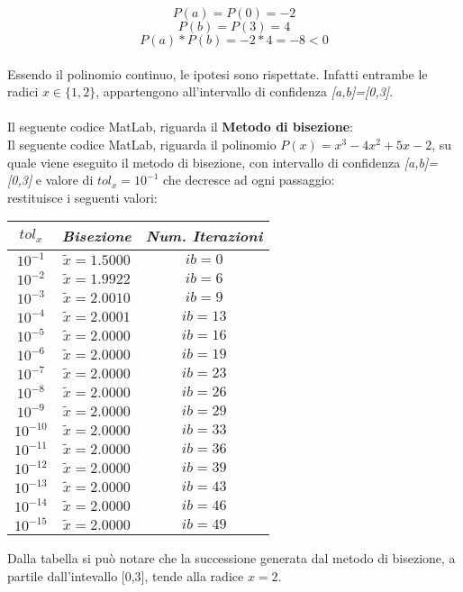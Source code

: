 	\[
	P(a) = P(0) = -2
	\]
	\[
	P(b) = P(3) = 4
	\]
	\[
	P(a)*P(b) = -2 * 4 = -8 < 0
	\]\\
Essendo il polinomio continuo, le ipotesi sono rispettate. Infatti entrambe le radici $x \in \{1,2\}$, appartengono all'intervallo di confidenza \textit{[a,b]=[0,3]}.\\\\
Il seguente codice MatLab, riguarda il \textbf{Metodo di bisezione}:\\
	
Il seguente codice MatLab, riguarda il polinomio $P(x) = x^3-4x^2+5x-2$, su quale viene eseguito il metodo di bisezione, con intervallo di confidenza \textit{[a,b]=[0,3]} e valore di $tol_x=10^{-1}$ che decresce ad ogni passaggio:\\
	
restituisce i seguenti valori:\\
\begin{center}
	\begin{tabular}{|c|c|c|}
		\hline
			$tol_x$ & \textit{Bisezione} & \textit{Num. Iterazioni} \\
		\hline
   			$10^{-1}$ & $\tilde{x} = 1.5000$ & $ib = 0$\\
    		$10^{-2}$ & $\tilde{x} = 1.9922$ & $ib = 6$\\
    		$10^{-3}$ & $\tilde{x} = 2.0010$ & $ib = 9$\\
    		$10^{-4}$ & $\tilde{x} = 2.0001$ & $ib = 13$\\
   			$10^{-5}$ & $\tilde{x} = 2.0000$ & $ib = 16$\\
   			$10^{-6}$ & $\tilde{x} = 2.0000$ & $ib = 19$\\
    		$10^{-7}$ & $\tilde{x} = 2.0000$ & $ib = 23$\\
    		$10^{-8}$ & $\tilde{x} = 2.0000$ & $ib = 26$\\
    		$10^{-9}$ & $\tilde{x} = 2.0000$ & $ib= 29$\\
    		$10^{-10}$ & $\tilde{x} = 2.0000$ & $ib = 33$\\
    		$10^{-11}$ & $\tilde{x} = 2.0000$ & $ib = 36$\\
    		$10^{-12}$ & $\tilde{x} = 2.0000$ & $ib = 39$\\
    		$10^{-13}$ & $\tilde{x} = 2.0000$ & $ib = 43$\\
    		$10^{-14}$ & $\tilde{x} = 2.0000$ & $ib = 46$\\
    		$10^{-15}$ & $\tilde{x} = 2.0000$ & $ib = 49$\\
		\hline
	\end{tabular}
\end{center}
Dalla tabella si può notare che la successione generata dal metodo di bisezione, a partile dall'intevallo [0,3], tende alla radice $x = 2$.
